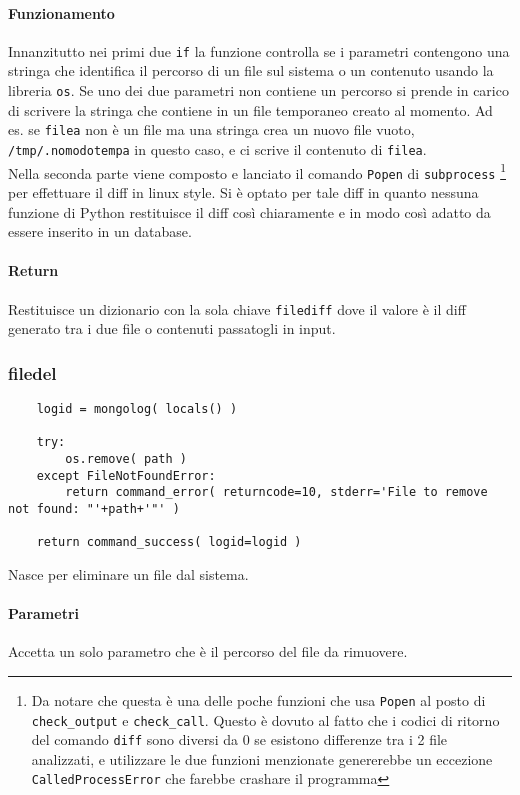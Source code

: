 \documentclass[11pt]{article}
\begin{document}
\paragraph{Funzionamento}
Innanzitutto nei primi due \texttt{if} la funzione controlla se i parametri contengono una stringa che identifica il percorso di un file sul sistema
o un contenuto usando la libreria \texttt{os}. Se uno dei due parametri non contiene un percorso si prende in carico di scrivere la stringa che contiene
in un file temporaneo creato al momento.
Ad es. se \texttt{filea} non è un file ma una stringa crea un nuovo file vuoto, \texttt{/tmp/.nomodotempa} in questo caso, e ci scrive il contenuto
di \texttt{filea}. \\
Nella seconda parte viene composto e lanciato il comando \texttt{Popen} di \texttt{subprocess}
\footnote{\label{Popenneeded} Da notare che questa è una delle poche funzioni che usa \texttt{Popen} al posto di \texttt{check\_output} e \texttt{check\_call}.
Questo è dovuto al fatto che i codici di ritorno del comando \texttt{diff} sono diversi da 0 se esistono differenze tra i 2 file analizzati, e utilizzare
le due funzioni menzionate genererebbe un eccezione \texttt{CalledProcessError} che farebbe crashare il programma}
per effettuare il diff in linux style. Si è optato per tale diff in quanto nessuna funzione di Python restituisce il diff
così chiaramente e in modo così adatto da essere inserito in un database.\\
\paragraph{Return}
Restituisce un dizionario con la sola chiave \texttt{filediff} dove il valore è il diff generato tra i due file o contenuti passatogli
in input.

\subsubsection{filedel}\label{filedel}
\begin{lstlisting}
    logid = mongolog( locals() )

    try:
        os.remove( path )
    except FileNotFoundError:
        return command_error( returncode=10, stderr='File to remove not found: "'+path+'"' )

    return command_success( logid=logid )
\end{lstlisting}
Nasce per eliminare un file dal sistema.
\paragraph{Parametri}
Accetta un solo parametro che è il percorso del file da rimuovere.
\end{document}
